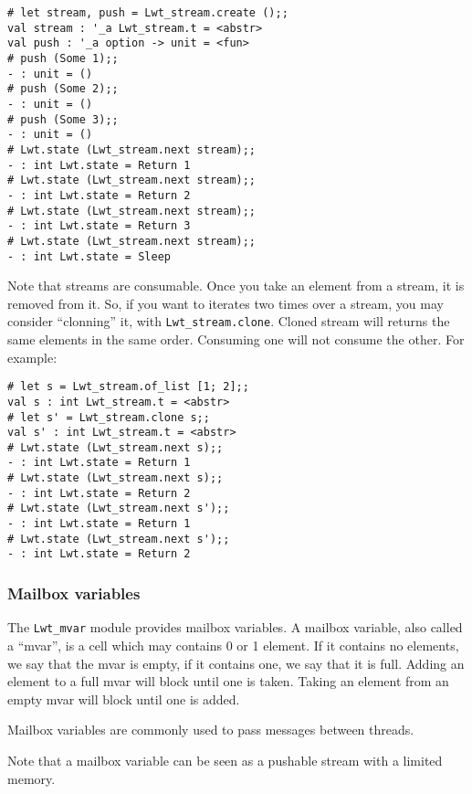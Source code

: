 \lstset{language=[Objective]Caml}\begin{lstlisting}
# let stream, push = Lwt_stream.create ();;
val stream : '_a Lwt_stream.t = <abstr>
val push : '_a option -> unit = <fun>
# push (Some 1);;
- : unit = ()
# push (Some 2);;
- : unit = ()
# push (Some 3);;
- : unit = ()
# Lwt.state (Lwt_stream.next stream);;
- : int Lwt.state = Return 1
# Lwt.state (Lwt_stream.next stream);;
- : int Lwt.state = Return 2
# Lwt.state (Lwt_stream.next stream);;
- : int Lwt.state = Return 3
# Lwt.state (Lwt_stream.next stream);;
- : int Lwt.state = Sleep

\end{lstlisting}
Note that streams are consumable. Once you take an element from a
stream, it is removed from it. So, if you want to iterates two times
over a stream, you may consider ``clonning'' it, with
{\tt Lwt\_stream.clone}. Cloned stream will returns the same
elements in the same order. Consuming one will not consume the other.
For example:



\lstset{language=[Objective]Caml}\begin{lstlisting}
# let s = Lwt_stream.of_list [1; 2];;
val s : int Lwt_stream.t = <abstr>
# let s' = Lwt_stream.clone s;;
val s' : int Lwt_stream.t = <abstr>
# Lwt.state (Lwt_stream.next s);;
- : int Lwt.state = Return 1
# Lwt.state (Lwt_stream.next s);;
- : int Lwt.state = Return 2
# Lwt.state (Lwt_stream.next s');;
- : int Lwt.state = Return 1
# Lwt.state (Lwt_stream.next s');;
- : int Lwt.state = Return 2

\end{lstlisting}
\subsubsection{ Mailbox variables }

The {\tt Lwt\_mvar} module provides mailbox variables. A mailbox
variable, also called a ``mvar'', is a cell which may contains 0 or 1
element. If it contains no elements, we say that the mvar is empty,
if it contains one, we say that it is full. Adding an element to a
full mvar will block until one is taken. Taking an element from an
empty mvar will block until one is added.



Mailbox variables are commonly used to pass messages between threads.



Note that a mailbox variable can be seen as a pushable stream with a
limited memory.



